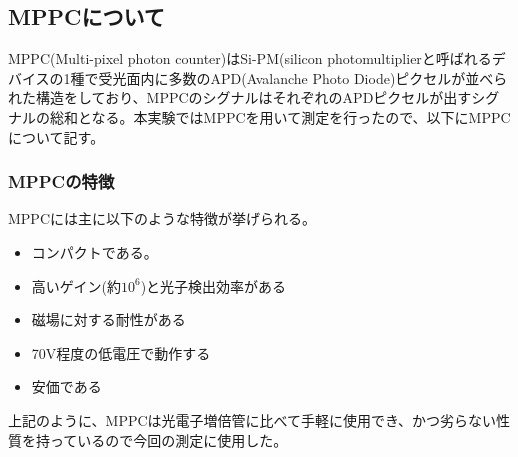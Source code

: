 \subsection{MPPCについて}
MPPC(Multi-pixel photon counter)はSi-PM(silicon photomultiplierと呼ばれるデバイスの1種で受光面内に多数のAPD(Avalanche Photo Diode)ピクセルが並べられた構造をしており、MPPCのシグナルはそれぞれのAPDピクセルが出すシグナルの総和となる。本実験ではMPPCを用いて測定を行ったので、以下にMPPCについて記す。
\subsubsection{MPPCの特徴}
MPPCには主に以下のような特徴が挙げられる。
\begin{itemize}
 \item コンパクトである。
 \item 高いゲイン(約$10^6$)と光子検出効率がある
 \item 磁場に対する耐性がある
 \item 70V程度の低電圧で動作する
 \item 安価である
\end{itemize}
上記のように、MPPCは光電子増倍管に比べて手軽に使用でき、かつ劣らない性質を持っているので今回の測定に使用した。
